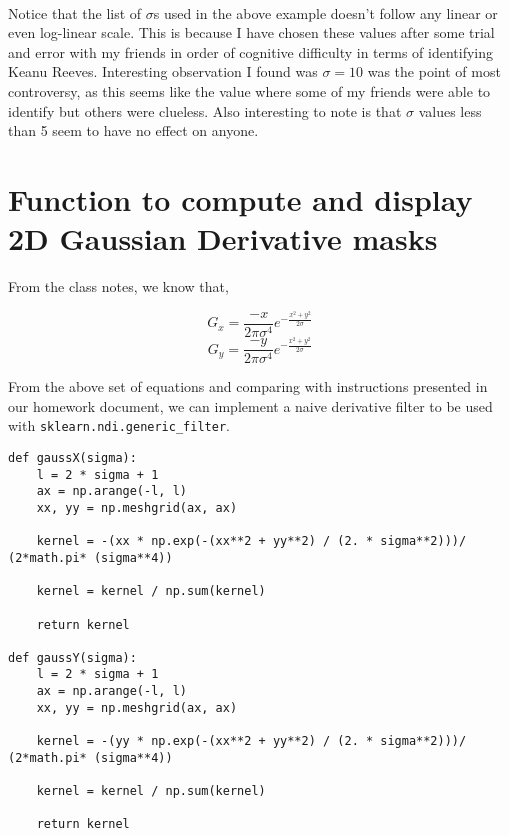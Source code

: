 \documentclass[11pt]{article}
\begin{document}
    \begin{center}
    \end{center}
    { \hspace*{\fill} \\}
    
    Notice that the list of \(\sigma\)s used in the above example doesn't
follow any linear or even log-linear scale. This is because I have
chosen these values after some trial and error with my friends in order
of cognitive difficulty in terms of identifying Keanu Reeves.
Interesting observation I found was \(\sigma=10\) was the point of most
controversy, as this seems like the value where some of my friends were
able to identify but others were clueless. Also interesting to note is
that \(\sigma\) values less than 5 seem to have no effect on anyone.

    \hypertarget{function-to-compute-and-display-2d-gaussian-derivative-masks}{%
\section{Function to compute and display 2D Gaussian Derivative
masks}\label{function-to-compute-and-display-2d-gaussian-derivative-masks}}

    From the class notes, we know that,

\[G_x = \frac{-x}{2\pi\sigma^4}e^{-\frac{x^2 + y^2}{2\sigma}}\]
\[G_y = \frac{-y}{2\pi\sigma^4}e^{-\frac{x^2 + y^2}{2\sigma}}\]

    From the above set of equations and comparing with instructions
presented in our homework document, we can implement a naive derivative
filter to be used with \texttt{sklearn.ndi.generic\_filter}.

\begin{verbatim}
def gaussX(sigma):
    l = 2 * sigma + 1
    ax = np.arange(-l, l)
    xx, yy = np.meshgrid(ax, ax)

    kernel = -(xx * np.exp(-(xx**2 + yy**2) / (2. * sigma**2)))/ (2*math.pi* (sigma**4))

    kernel = kernel / np.sum(kernel)

    return kernel

def gaussY(sigma):
    l = 2 * sigma + 1
    ax = np.arange(-l, l)
    xx, yy = np.meshgrid(ax, ax)

    kernel = -(yy * np.exp(-(xx**2 + yy**2) / (2. * sigma**2)))/ (2*math.pi* (sigma**4))

    kernel = kernel / np.sum(kernel)

    return kernel
\end{verbatim}
\end{document}
